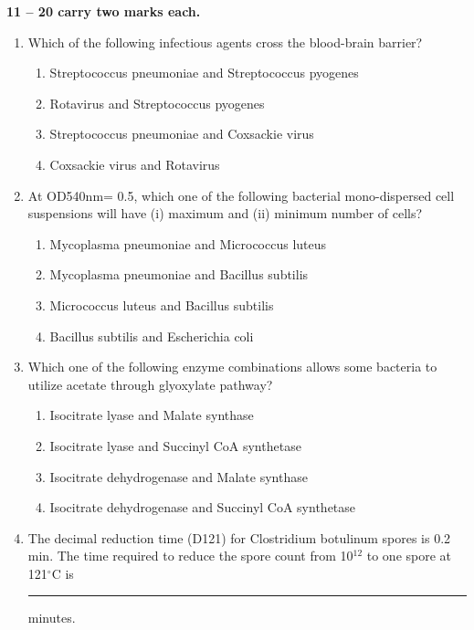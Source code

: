 \documentclass[journal,12pt,onecolumn]{IEEEtran}
\begin{document}
\vspace{0.5cm}
\noindent \textbf{ 11 -- 20 carry two marks each.}

\begin{enumerate}[label=\arabic*.,resume]

\item Which of the following infectious agents cross the blood-brain barrier?

\begin{enumerate}[label=(\Alph*)]
\item Streptococcus pneumoniae and Streptococcus pyogenes
\item Rotavirus and Streptococcus pyogenes
\item Streptococcus pneumoniae and Coxsackie virus
\item Coxsackie virus and Rotavirus
\end{enumerate}

\item At OD540nm= 0.5, which one of the following bacterial mono-dispersed cell suspensions will have (i) maximum and (ii) minimum number of cells?

\begin{enumerate}[label=(\Alph*)]
\item Mycoplasma pneumoniae and Micrococcus luteus
\item Mycoplasma pneumoniae and Bacillus subtilis
\item Micrococcus luteus and Bacillus subtilis
\item Bacillus subtilis and Escherichia coli
\end{enumerate}

\item Which one of the following enzyme combinations allows some bacteria to utilize acetate through glyoxylate pathway?

\begin{enumerate}[label=(\Alph*)]
\item Isocitrate lyase and Malate synthase
\item Isocitrate lyase and Succinyl CoA synthetase
\item Isocitrate dehydrogenase and Malate synthase
\item Isocitrate dehydrogenase and Succinyl CoA synthetase
\end{enumerate}

\item The decimal reduction time (D121) for Clostridium botulinum spores is 0.2 min. The time required to reduce the spore count from 10$^{12}$ to one spore at 121$^\circ$C is \rule{2.5cm}{0.1pt} minutes.


\end{enumerate}
\end{document}
